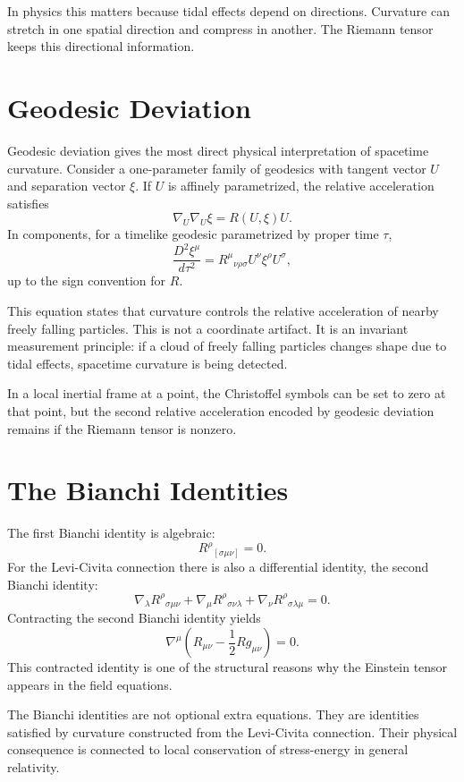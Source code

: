 In physics this matters because tidal effects depend on directions. Curvature
can stretch in one spatial direction and compress in another. The Riemann tensor
keeps this directional information.

\clearpage

\section{Geodesic Deviation}

Geodesic deviation gives the most direct physical interpretation of spacetime
curvature. Consider a one-parameter family of geodesics with tangent vector
\(U\) and separation vector \(\xi\). If \(U\) is affinely parametrized, the
relative acceleration satisfies
\[
\boxed{
\nabla_U\nabla_U\xi=R(U,\xi)U.
}
\]
In components, for a timelike geodesic parametrized by proper time \(\tau\),
\[
\frac{D^2\xi^\mu}{d\tau^2}
=R^\mu{}_{\nu\rho\sigma}U^\nu\xi^\rho U^\sigma,
\]
up to the sign convention for \(R\).

This equation states that curvature controls the relative acceleration of nearby
freely falling particles. This is not a coordinate artifact. It is an invariant
measurement principle: if a cloud of freely falling particles changes shape due
to tidal effects, spacetime curvature is being detected.

In a local inertial frame at a point, the Christoffel symbols can be set to zero
at that point, but the second relative acceleration encoded by geodesic
deviation remains if the Riemann tensor is nonzero.

\clearpage

\section{The Bianchi Identities}

The first Bianchi identity is algebraic:
\[
R^\rho{}_{[\sigma\mu\nu]}=0.
\]
For the Levi-Civita connection there is also a differential identity, the second
Bianchi identity:
\[
\nabla_\lambda R^\rho{}_{\sigma\mu\nu}
+
\nabla_\mu R^\rho{}_{\sigma\nu\lambda}
+
\nabla_\nu R^\rho{}_{\sigma\lambda\mu}=0.
\]
Contracting the second Bianchi identity yields
\[
\nabla^\mu\left(R_{\mu\nu}-\frac{1}{2}Rg_{\mu\nu}\right)=0.
\]
This contracted identity is one of the structural reasons why the Einstein
tensor appears in the field equations.

The Bianchi identities are not optional extra equations. They are identities
satisfied by curvature constructed from the Levi-Civita connection. Their
physical consequence is connected to local conservation of stress-energy in
general relativity.

